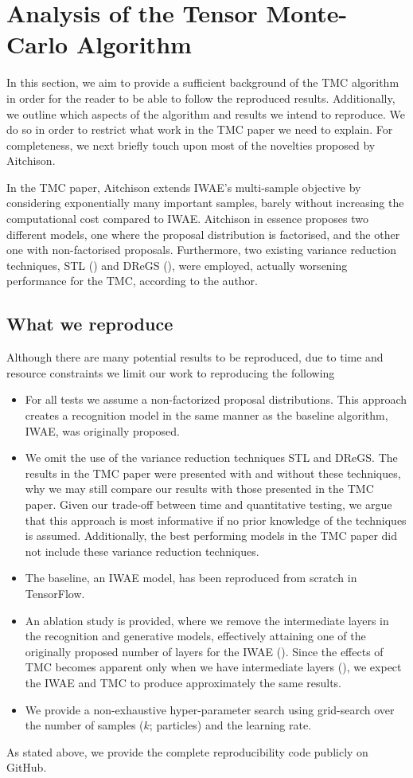 \section{Analysis of the Tensor Monte-Carlo Algorithm}
In this section, we aim to provide a sufficient background of the TMC algorithm in order for the reader to be able to follow the reproduced results. Additionally, we outline which aspects of the algorithm and results we intend to reproduce.
We do so in order to restrict what work in the TMC paper we need to explain.
 For completeness, we next briefly touch upon most of the novelties proposed by Aitchison.

In the TMC paper, Aitchison extends IWAE's multi-sample objective by considering exponentially many important samples, barely without increasing the computational cost compared to IWAE. Aitchison in essence proposes two different models, one where the proposal distribution is factorised, and the other one with non-factorised proposals. Furthermore, two existing variance reduction techniques, STL (\cite{roeder2017sticking}) and DReGS (\cite{tucker2018doubly}), were employed, actually worsening performance for the TMC, according to the author. 

\subsection{What we reproduce}
Although there are many potential results to be reproduced, due to time and resource constraints we limit our work to reproducing the following
\begin{itemize}
    \item For all tests we assume a non-factorized proposal distributions. This approach creates a recognition model in the same manner as the baseline algorithm, IWAE, was originally proposed.
    \item We omit the use of the variance reduction techniques STL and DReGS. The results in the TMC paper were presented with and without these techniques, why we may still compare our results with those presented in the TMC paper. Given our trade-off between time and quantitative testing, we argue that this approach is most informative if no prior knowledge of the techniques is assumed. Additionally, the best performing models in the TMC paper did not include these variance reduction techniques.
    \item The baseline, an IWAE model, has been reproduced from scratch in TensorFlow.
    \item An ablation study is provided, where we remove the intermediate layers in the recognition and generative models, effectively attaining one of the originally proposed number of layers for the IWAE (\cite{iwae}). Since the effects of TMC becomes apparent only when we have intermediate layers (\cite{tmc}), we expect the IWAE and TMC to produce approximately the same results.
    \item We provide a non-exhaustive hyper-parameter search using grid-search over the number of samples ($k$; particles) and the learning rate.
\end{itemize}
As stated above, we provide the complete reproducibility code publicly on GitHub. 

